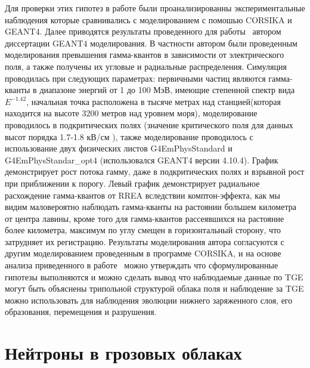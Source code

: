 Для проверки этих гипотез в работе были проанализированны экспериментальные наблюдения которые сравнивались с моделированием с помошью CORSIKA и GEANT4. Далее приводятся результаты проведенного для работы~\cite{PhysRevD.98.082001}  автором диссертации GEANT4 моделирования. В частности автором были проведенным моделирования превышения гамма-квантов в зависимости от электрического поля, а также получены их угловые и радиальные распределения. Симуляция проводилась при следующих параметрах: первичными частиц являются гамма-кванты в диапазоне энергий от 1 до 100 МэВ, имеющие степенной спектр вида $E^{-1.42}$, начальная точка расположена в тысяче метрах над станцией(которая находится на высоте 3200 метров над уровнем моря), моделирование проводилось в подкритических полях (значение критического поля для данных высот порядка 1.7-1.8 кВ/см
), также моделирование проводилось с использование двух физических листов G4EmPhysStandard и G4EmPhysStandar\_opt4 (использовался GEANT4 версии 4.10.4). График демонстрирует рост потока гамму, даже в подкритических полях и взрывной рост при приближении к порогу. Левый график демонстрирует радиальное расхождение гамма-квантов от RREA вследствии комптон-эффекта, как мы видим маловероятно наблюдать гамма-кванты на растоянии большем километра от центра лавины, кроме того для гамма-квантов рассеявшихся на растояние более километра, максимум по углу смещен в горизонтальный сторону, что затрудняет их регистрацию. Результаты моделирования автора согласуются с другим моделированием проведенным в программе CORSIKA, и на основе анализа приведенного в работе~\cite{PhysRevD.98.082001} можно утверждать что сформулированные гипотезы выполняются и можно сделать вывод что наблюдаемые данные по TGE могут быть объяснены трипольной структурой облака поля и наблюдение за TGE можно использовать для наблюдения эволюции нижнего заряженного слоя, его образования, перемещения и разрушения.

\section{Нейтроны в грозовых облаках}\label{sec:thunderstorm/neutron} 


